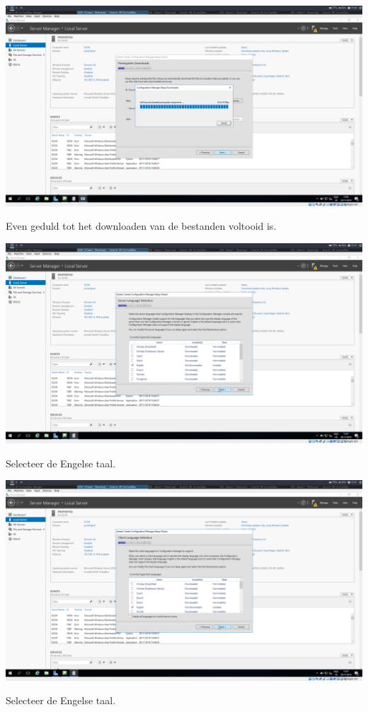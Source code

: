 \documentclass[a4paper]{article}
\begin{document}
\begin{center}
\includegraphics[width=15cm]{Pictures/SCCM/6/1543502769.png}

Even geduld tot het downloaden van de bestanden voltooid is.
\end{center}
\begin{center}
\includegraphics[width=15cm]{Pictures/SCCM/6/1543502844.png}

Selecteer de Engelse taal.
\end{center}
\begin{center}
\includegraphics[width=15cm]{Pictures/SCCM/6/1543502847.png}

Selecteer de Engelse taal.
\end{center}
\end{document}
